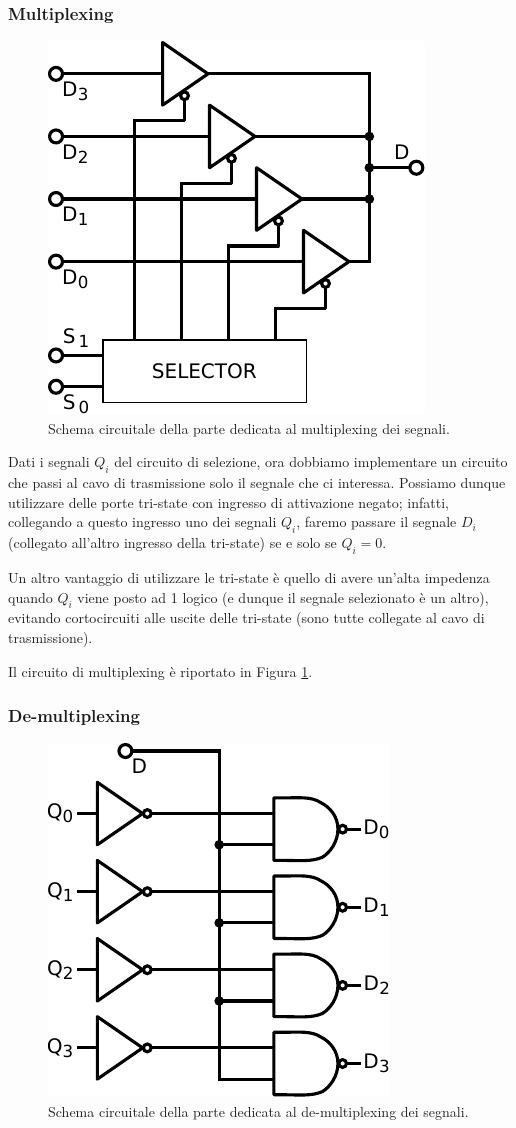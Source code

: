 \newpage
\subsubsection{Multiplexing}

\begin{figure}
\centering
\includegraphics[width=.25\textwidth]{../E10/latex/mult.pdf}
\caption{Schema circuitale della parte dedicata al multiplexing dei segnali.}
\label{cir10:mult}
\end{figure}

Dati i segnali $Q_i$ del circuito di selezione, ora dobbiamo implementare un circuito che passi al cavo di trasmissione solo il segnale che ci interessa.
Possiamo dunque utilizzare delle porte tri-state con ingresso di attivazione negato; infatti, collegando a questo ingresso uno dei segnali $Q_i$, faremo passare il segnale $D_i$ (collegato all'altro ingresso della tri-state) se e solo se $Q_i=0$.

Un altro vantaggio di utilizzare le tri-state è quello di avere un'alta impedenza quando $Q_i$ viene posto ad 1 logico (e dunque il segnale selezionato è un altro), evitando cortocircuiti alle uscite delle tri-state (sono tutte collegate al cavo di trasmissione).

Il circuito di multiplexing è riportato in Figura \ref{cir10:mult}.

\subsubsection{De-multiplexing}

\begin{figure}
\centering
\includegraphics[width=.25\textwidth]{../E10/latex/demult.pdf}
\caption{Schema circuitale della parte dedicata al de-multiplexing dei segnali.}
\label{cir10:demult}
\end{figure}

